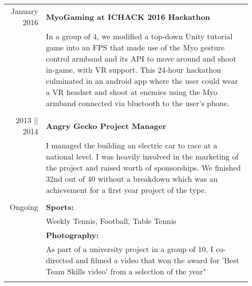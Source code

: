 \documentclass[a4paper,10pt]{article}
\begin{document}
	\begin{tabular}{r|p{12cm}}
		January 2016 & \textbf{MyoGaming at ICHACK 2016 Hackathon} \\&In a group of 4, we modified a top-down Unity tutorial game into an FPS that made use of the Myo gesture control armband and its API to move around and shoot in-game, with VR support.
		This 24-hour hackathon culminated in an android app where the user could wear a VR headset and shoot at enemies using the Myo armband connected via bluetooth to the user's phone.
		\\\multicolumn{2}{c}{} \\
		
		2013 || 2014 & \textbf{Angry Gecko Project Manager} \\& I managed the building an electric car to race at a national level. I was heavily involved in the marketing 		of the project and raised \textsterling700 worth of sponsorships. We finished 32nd out of 40 without a breakdown which was an achievement for a first year project of the type. 
		\\\multicolumn{2}{c}{} \\
		
		Ongoing & \textbf{Sports:} \\& Weekly Tennis, Football, Table Tennis \\& \textbf{Photography:} \\& As part of a university project in a group of 10, I co-directed and filmed a video that won the award for 'Best Team Skills video' from a selection of the year"
		\\\multicolumn{2}{c}{} \\
		
	\end{tabular}
	
	
	
	
\end{document}
